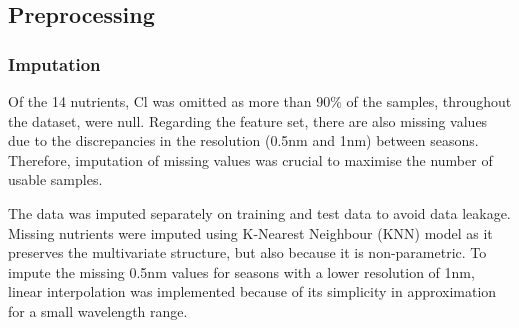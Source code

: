 \documentclass[conference]{IEEEtran}
\begin{document}
\subsection{Preprocessing}\label{PP}
\subsubsection{Imputation}\label{Imputation}
Of the 14 nutrients, Cl was omitted as more than 90\% of the samples, throughout the dataset, were null. Regarding the feature set, there are also missing values due to the discrepancies in the resolution (0.5nm and 1nm) between seasons. Therefore, imputation of missing values was crucial to maximise the number of usable samples. 

The data was imputed separately on training and test data to avoid data leakage. Missing nutrients were imputed using K-Nearest Neighbour (KNN) model as it preserves the multivariate structure, but also because it is non-parametric. To impute the missing 0.5nm values for seasons with a lower resolution of 1nm, linear interpolation was implemented because of its simplicity in approximation for a small wavelength range.
\vspace{0.1cm}
\end{document}
